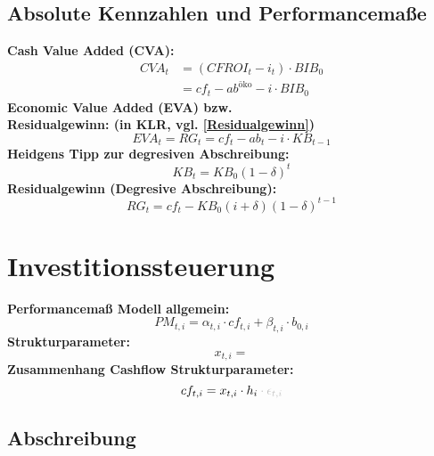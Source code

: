 \documentclass[leqno]{scrartcl}
\begin{document}
\begin{multicols}{4}
\subsection{Absolute Kennzahlen und Performancemaße}

\textbf{Cash Value Added (CVA):}
  \begin{equation*}
  \begin{split}
    CVA_t &= (CFROI_t - i_t) \cdot BIB_0\\
          &= cf_t-ab^{\text{öko}}- i\cdot BIB_0
  \end{split}
  \end{equation*}
\textbf{Economic Value Added (EVA) bzw.}\\
\textbf{Residualgewinn: (in KLR, vgl. \ref{Residualgewinn})}
  \begin{equation*}
    EVA_t = RG_t = cf_t - ab_t - i\cdot KB_{t-1}
  \end{equation*}
\textbf{Heidgens Tipp zur degresiven Abschreibung:}
  \begin{equation*}
    KB_t = KB_0(1-\delta)^t
  \end{equation*}
\textbf{Residualgewinn (Degresive Abschreibung):}
  \begin{equation*} 
    RG_t = cf_t - KB_0(i+\delta)(1-\delta)^{t-1}
  \end{equation*}


\section{Investitionssteuerung}

\textbf{Performancemaß Modell allgemein:}
  \begin{equation*}
    PM_{t,i} = \alpha_{t,i} \cdot cf_{t,i} + \beta_{t,i} \cdot b_{0,i}
  \end{equation*}
\textbf{Strukturparameter:}
  \begin{equation*}
    x_{t,i} =
  \end{equation*}
\textbf{Zusammenhang Cashflow Strukturparameter:}
  \begin{equation*}
    cf_{t,i} = x_{t,i} \cdot h_i \color{lightgray}\cdot \epsilon_{t,i}
  \end{equation*}

\subsection{Abschreibung}


\end{multicols}
\end{document}
